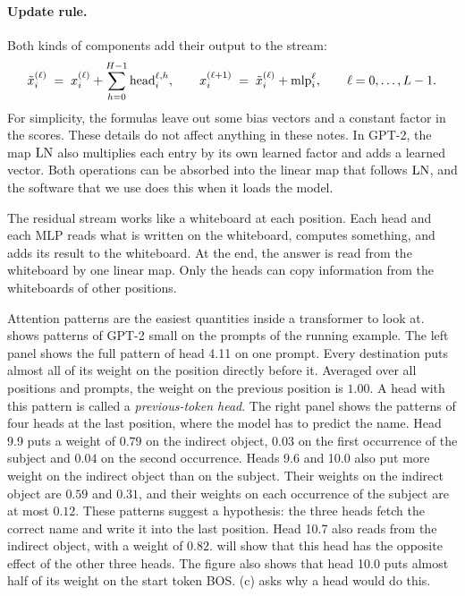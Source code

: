 \paragraph{Update rule.} Both kinds of components add their output to the stream:
\begin{equation}\label{eq:update}
\tilde x_i^{(\ell)} \;=\; x_i^{(\ell)}+\sum_{h=0}^{H-1}\mathrm{head}_i^{\ell,h},\qquad
x_i^{(\ell+1)} \;=\; \tilde x_i^{(\ell)}+\mathrm{mlp}_i^{\ell},\qquad \ell=0,\dots,L-1 .
\end{equation}
For simplicity, the formulas leave out some bias vectors and a constant factor in the scores. These details do
not affect anything in these notes. In GPT-2, the map $\mathrm{LN}$ also multiplies each entry by its own learned factor
and adds a learned vector. Both operations can be absorbed into the linear map that follows $\mathrm{LN}$, and the
software that we use does this when it loads the model.

\begin{intuition}
The residual stream works like a whiteboard at each position. Each head and each MLP reads what is written on
the whiteboard, computes something, and adds its result to the whiteboard. At the end, the answer is read from
the whiteboard by one linear map. Only the heads can copy information from the whiteboards of other positions.
\end{intuition}

\begin{experiment}\label{exp:attention} 
Attention patterns are the easiest quantities inside a transformer to look at.  shows
patterns of GPT-2 small on the prompts of the running example. The left panel shows the full pattern of head 4.11
on one prompt. Every destination puts almost all of its weight on the position directly before it. Averaged over
all positions and prompts, the weight on the previous position is $1.00$. A head with this pattern is called a
\emph{previous-token head}. The right panel shows the patterns of four heads at the last position, where the model
has to predict the name. Head 9.9 puts a weight of $0.79$ on the indirect object, $0.03$ on the first occurrence of
the subject and $0.04$ on the second occurrence. Heads 9.6 and 10.0 also put more weight on the indirect object than
on the subject. Their weights on the indirect object are $0.59$ and $0.31$, and their weights on each occurrence of
the subject are at most $0.12$. These patterns suggest a hypothesis: the three heads fetch the correct name and
write it into the last position. Head 10.7 also reads from the indirect object, with a weight of $0.82$.
 will show that this head has the opposite effect of the other three heads. The figure also shows
that head 10.0 puts almost half of its weight on the start token BOS. (c) asks why a head would do
this.
\end{experiment}

